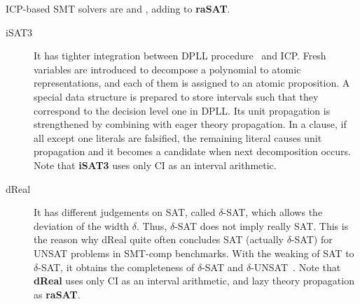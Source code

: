 \documentclass[runningheads,a4paper,oribibl]{llncs}
\begin{document}
ICP-based SMT solvers are  and , adding to \textbf{raSAT}. 
\begin{description}
\item[iSAT3] It has tighter integration between DPLL procedure~\cite{dpll} and ICP. 
Fresh variables are introduced to decompose a polynomial to atomic representations, 
and each of them is assigned to an atomic proposition. 
A special data structure is prepared to store intervals such that 
they correspond to the decision level one in DPLL. 
Its unit propagation is strengthened by combining with eager theory propagation. 
In a clause, if all except one literals are falsified, the remaining literal causes unit propagation 
and it becomes a candidate when next decomposition occurs. 
Note that \textbf{iSAT3} uses only CI as an interval arithmetic. 

\item[dReal] It has different judgements on SAT, called $\delta$-SAT, which allows the deviation of the width $\delta$. 
Thus, $\delta$-SAT does not imply really SAT. This is the reason why dReal quite often concludes SAT (actually $\delta$-SAT) 
for UNSAT problems in SMT-comp benchmarks. With the weaking of SAT to $\delta$-SAT, it obtains the completeness of 
$\delta$-SAT and $\delta$-UNSAT~\cite{Gao:2012:9DP:2352896.2352921}. 
Note that \textbf{dReal} uses only CI as an interval arithmetic, and lazy theory propagation as {\bf raSAT}. 
\end{description}
\end{document}
